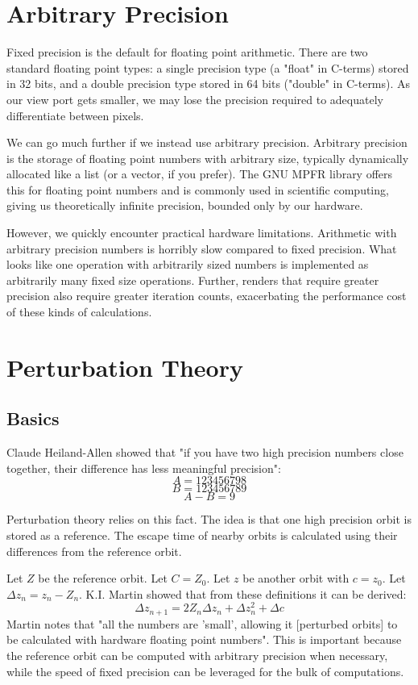 \documentclass{article}
\begin{document}
\section{Arbitrary Precision}
\par Fixed precision is the default for floating point arithmetic. There are two standard floating point types: a single precision type (a "float" in C-terms) stored in 32 bits, and a double precision type stored in 64 bits ("double" in C-terms). As our view port gets smaller, we may lose the precision required to adequately differentiate between pixels.
\par We can go much further if we instead use arbitrary precision. Arbitrary precision is the storage of floating point numbers with arbitrary size, typically dynamically allocated like a list (or a vector, if you prefer). The GNU MPFR library offers this for floating point numbers and is commonly used in scientific computing, giving us theoretically infinite precision, bounded only by our hardware.
\par However, we quickly encounter practical hardware limitations. Arithmetic with arbitrary precision numbers is horribly slow compared to fixed precision. What looks like one operation with arbitrarily sized numbers is implemented as arbitrarily many fixed size operations. Further, renders that require greater precision also require greater iteration counts, exacerbating the performance cost of these kinds of calculations.
\section{Perturbation Theory}
\subsection{Basics}
\par Claude Heiland-Allen showed that "if you have two high precision numbers close together, their difference has less meaningful precision":
    \[ A = 123456798 \]
    \[ B = 123456789 \]
    \[ A - B = 9 \] \cite{Allen_2013_10}
\par Perturbation theory relies on this fact. The idea is that one high precision orbit is stored as a reference. The escape time of nearby orbits is calculated using their differences from the reference orbit.
\par Let $Z$ be the reference orbit. Let $C=Z_0$. Let $z$ be another orbit with $c=z_0$. Let $\Delta z_n = z_n - Z_n$. K.I. Martin showed that from these definitions it can be derived:
\[\Delta z_{n+1} = 2Z_n\Delta z_n+\Delta z_n^2 + \Delta c\] \cite{Martin_}
Martin notes that "all the numbers are ’small’, allowing it [perturbed orbits] to be calculated with hardware floating point numbers". This is important because the reference orbit can be computed with arbitrary precision when necessary, while the speed of fixed precision can be leveraged for the bulk of computations.
\end{document}
